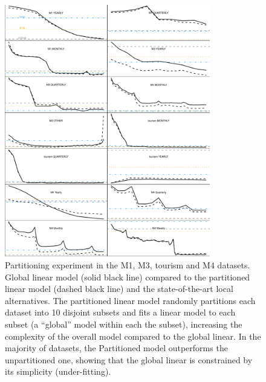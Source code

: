 \documentclass[a4paper]{article}
\theoremstyle{custom}
\begin{document}
%
%

\begin{figure}
  \centering
  \includegraphics[width=0.8\textwidth]{fig/partitioning.pdf}
  \caption{Partitioning experiment in the M1, M3, tourism and M4 datasets. Global linear model (solid black line) compared to the partitioned linear model (dashed black line) and the state-of-the-art local alternatives. The partitioned linear model randomly partitions each dataset into 10 disjoint subsets and fits a linear model to each subset (a ``global'' model within each the subset), increasing the complexity of the overall model compared to the global linear. In the majority of datasets, the Partitioned model outperforms the unpartitioned one, showing that the global linear is constrained by its simplicity (under-fitting).}
  \label{fig:partitioningextra}
\end{figure}
\end{document}
